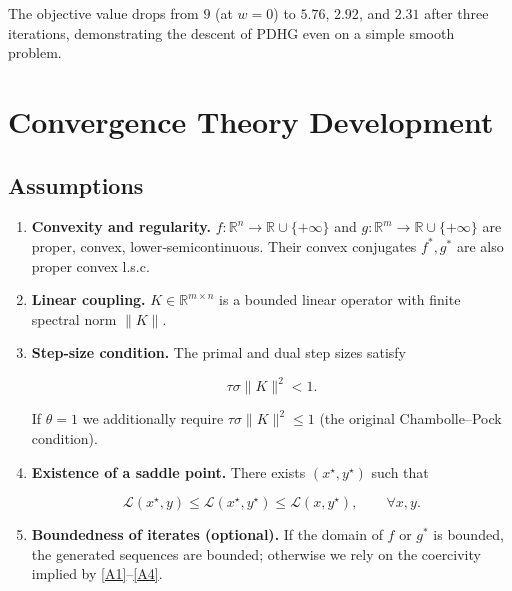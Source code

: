 \documentclass{article}
\begin{document}
The objective value drops from \(9\) (at \(w=0\)) to \(5.76\), \(2.92\), and \(2.31\) after three iterations, demonstrating the descent of PDHG even on a simple smooth problem.

\newpage
\section*{Convergence Theory Development}

\subsection*{Assumptions}
\begin{enumerate}[label={\bf(A\arabic*)}]
\item \label{A1} \textbf{Convexity and regularity.}  
\(f:\mathbb{R}^{n}\!\to\!\mathbb{R}\cup\{+\infty\}\) and \(g:\mathbb{R}^{m}\!\to\!\mathbb{R}\cup\{+\infty\}\) are proper, convex, lower‑semicontinuous.  
Their convex conjugates \(f^{*},g^{*}\) are also proper convex l.s.c.

\item \label{A2} \textbf{Linear coupling.}  
\(K\in\mathbb{R}^{m\times n}\) is a bounded linear operator with finite spectral norm \(\|K\|\).

\item \label{A3} \textbf{Step‑size condition.}  
The primal and dual step sizes satisfy  

\[
\tau\sigma\|K\|^{2}<1 .
\tag{4}
\]

If \(\theta=1\) we additionally require \(\tau\sigma\|K\|^{2}\le 1\) (the original Chambolle–Pock condition).

\item \label{A4} \textbf{Existence of a saddle point.}  
There exists \((x^{\star},y^{\star})\) such that  

\[
\mathcal{L}(x^{\star},y)\le\mathcal{L}(x^{\star},y^{\star})\le\mathcal{L}(x,y^{\star}),\qquad\forall x,y .
\tag{5}
\]

\item \label{A5} \textbf{Boundedness of iterates (optional).}  
If the domain of \(f\) or \(g^{*}\) is bounded, the generated sequences are bounded; otherwise we rely on the coercivity implied by \eqref{A1}–\eqref{A4}.
\end{enumerate}
\end{document}
